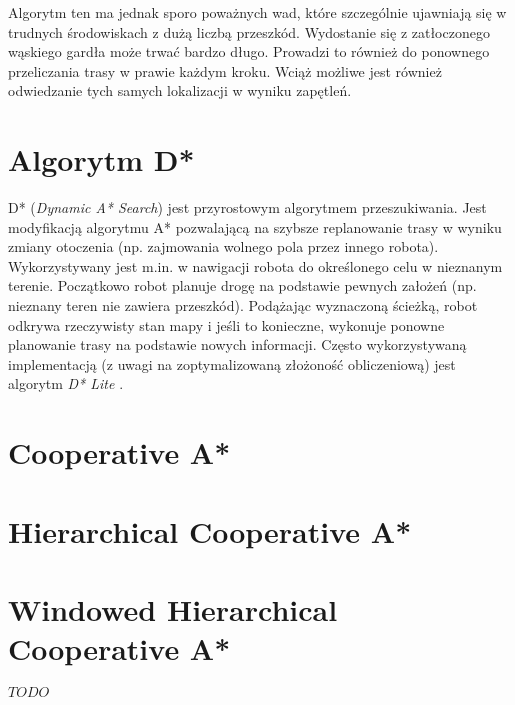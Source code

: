 Algorytm ten ma jednak sporo poważnych wad, które szczególnie ujawniają się w trudnych środowiskach z dużą liczbą przeszkód. Wydostanie się z zatłoczonego wąskiego gardła może trwać bardzo długo. Prowadzi to również do ponownego przeliczania trasy w prawie każdym kroku. Wciąż możliwe jest również odwiedzanie tych samych lokalizacji w wyniku zapętleń.

\section{Algorytm D*}
D* ({\it Dynamic A* Search}) jest przyrostowym algorytmem przeszukiwania. Jest modyfikacją algorytmu A* pozwalającą na szybsze replanowanie trasy w wyniku zmiany otoczenia (np. zajmowania wolnego pola przez innego robota). Wykorzystywany jest m.in. w nawigacji robota do określonego celu w nieznanym terenie. Początkowo robot planuje drogę na podstawie pewnych założeń (np. nieznany teren nie zawiera przeszkód). Podążając wyznaczoną ścieżką, robot odkrywa rzeczywisty stan mapy i jeśli to konieczne, wykonuje ponowne planowanie trasy na podstawie nowych informacji.
Często wykorzystywaną implementacją (z uwagi na zoptymalizowaną złożoność obliczeniową) jest algorytm {\it D* Lite} \cite{dstarlite}.

\section{Cooperative A*}

\section{Hierarchical Cooperative A*}

\section{Windowed Hierarchical Cooperative A*}

$TODO$

